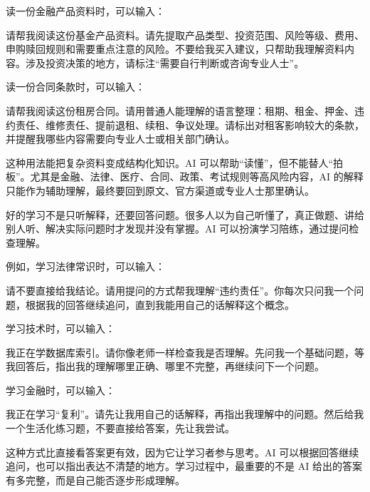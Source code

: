 读一份金融产品资料时，可以输入：

\begin{tcolorbox}[promptbox]
请帮我阅读这份基金产品资料。请先提取产品类型、投资范围、风险等级、费用、申购赎回规则和需要重点注意的风险。不要给我买入建议，只帮助我理解资料内容。涉及投资决策的地方，请标注“需要自行判断或咨询专业人士”。
\end{tcolorbox}

读一份合同条款时，可以输入：

\begin{tcolorbox}[promptbox]
请帮我阅读这份租房合同。请用普通人能理解的语言整理：租期、租金、押金、违约责任、维修责任、提前退租、续租、争议处理。请标出对租客影响较大的条款，并提醒我哪些内容需要向专业人士或相关部门确认。
\end{tcolorbox}

这种用法能把复杂资料变成结构化知识。AI 可以帮助“读懂”，但不能替人“拍板”。尤其是金融、法律、医疗、合同、政策、考试规则等高风险内容，AI 的解释只能作为辅助理解，最终要回到原文、官方渠道或专业人士那里确认。


好的学习不是只听解释，还要回答问题。很多人以为自己听懂了，真正做题、讲给别人听、解决实际问题时才发现并没有掌握。AI 可以扮演学习陪练，通过提问检查理解。

例如，学习法律常识时，可以输入：

\begin{tcolorbox}[promptbox]
请不要直接给我结论。请用提问的方式帮我理解“违约责任”。你每次只问我一个问题，根据我的回答继续追问，直到我能用自己的话解释这个概念。
\end{tcolorbox}

学习技术时，可以输入：

\begin{tcolorbox}[promptbox]
我正在学数据库索引。请你像老师一样检查我是否理解。先问我一个基础问题，等我回答后，指出我的理解哪里正确、哪里不完整，再继续问下一个问题。
\end{tcolorbox}

学习金融时，可以输入：

\begin{tcolorbox}[promptbox]
我正在学习“复利”。请先让我用自己的话解释，再指出我理解中的问题。然后给我一个生活化练习题，不要直接给答案，先让我尝试。
\end{tcolorbox}

这种方式比直接看答案更有效，因为它让学习者参与思考。AI 可以根据回答继续追问，也可以指出表达不清楚的地方。学习过程中，最重要的不是 AI 给出的答案有多完整，而是自己能否逐步形成理解。

